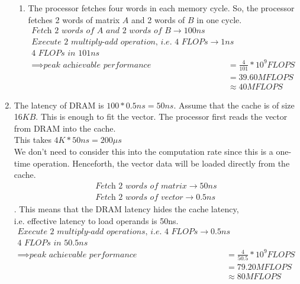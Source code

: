 \documentclass{article}
\begin{document}
\begin{enumerate}[label=\Large\textbf{\arabic*}.]
\begin{enumerate}[label={\arabic*}.]
	\item
	The processor fetches four words in each memory cycle. So, the processor fetches 2 words of matrix $A$ and 2 words of $B$ in one cycle.
	\begin{align*}
		\textit{Fetch 2 words of A and 2 words of B} \to 100ns
		\\\textit{Execute 2 multiply-add operation, i.e. 4 FLOPs} \to 1ns
		\\\textit{4 FLOPs in } 101ns
		\\\implies \textit{peak achievable performance} &= \frac{4}{101} * 10^9 FLOPS
		\\&= 39.60 MFLOPS 
		\\&\approx 40 MFLOPS
	\end{align*}
	
	
\end{enumerate}

\item
	The latency of DRAM is $100 * 0.5 ns = 50 ns$.
	Assume that the cache is of size 16$KB$. This is enough to fit the vector.
	The processor first reads the vector from DRAM into the cache.
	\\ This takes $4K * 50 ns = 200 \mu	s$
	\\ We don't need to consider this into the computation rate since this is a one-time operation. Henceforth, the vector data will be loaded directly from the cache. 
	\begin{align*}
		\textit{Fetch 2 words of matrix} \to 50ns
		\\\textit{Fetch 2 words of vector} \to 0.5 ns
	\end{align*}
	. 
	This means that the DRAM latency hides the cache latency, 
	\\i.e. effective latency to load operands is 50ns.
	\begin{align*}
		\textit{Execute 2 multiply-add operations, i.e. 4 FLOPs} \to 0.5ns
		\\\textit{4 FLOPs in } 50.5ns
		\\\implies \textit{peak achievable performance} &= \frac{4}{50.5} * 10^9 FLOPS
		\\&= 79.20 MFLOPS 
		\\&\approx 80 MFLOPS
	\end{align*}


\end{enumerate}
\end{document}
